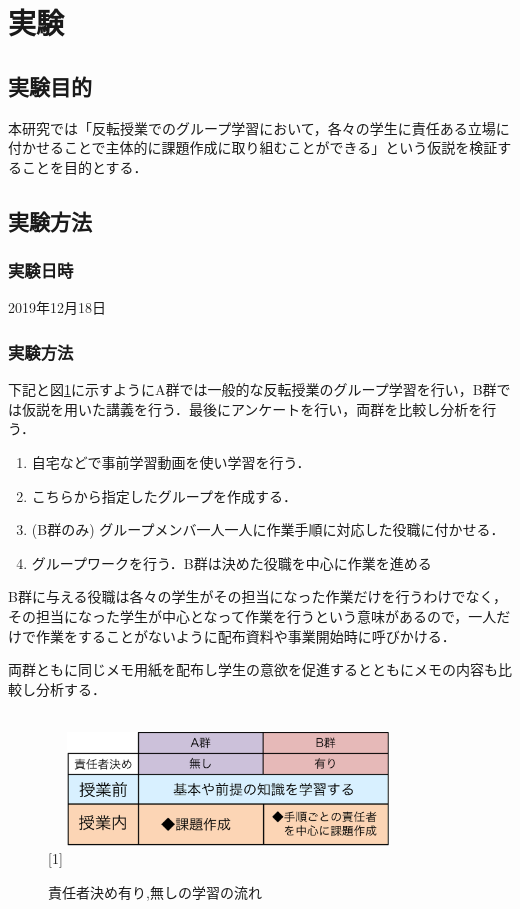 \documentclass[a4j,11pt]{jsarticle}
\begin{document}
\section{実験}

\subsection{実験目的}
本研究では「反転授業でのグループ学習において，各々の学生に責任ある立場に付かせることで主体的に課題作成に取り組むことができる」という仮説を検証することを目的とする．

\subsection{実験方法}

\subsubsection{実験日時}
2019年12月18日
\subsubsection{実験方法}
下記と図\ref{nagare}に示すようにA群では一般的な反転授業のグループ学習を行い，B群では仮説を用いた講義を行う．最後にアンケートを行い，両群を比較し分析を行う．


\begin{enumerate}
   \item 自宅などで事前学習動画を使い学習を行う．
   \item こちらから指定したグループを作成する．
   \item{(B群のみ) } グループメンバ一人一人に作業手順に対応した役職に付かせる．
   \item グループワークを行う．B群は決めた役職を中心に作業を進める
\end{enumerate}


B群に与える役職は各々の学生がその担当になった作業だけを行うわけでなく，その担当になった学生が中心となって作業を行うという意味があるので，一人だけで作業をすることがないように配布資料や事業開始時に呼びかける．

両群ともに同じメモ用紙を配布し学生の意欲を促進するとともにメモの内容も比較し分析する．



\begin{figure}[h]
\begin{center}
\scalebox{1}[1]{
 \includegraphics[clip,width=85mm,height=40mm]{nagare12.pdf}
 }
\end{center}
 \caption{責任者決め有り,無しの学習の流れ}
 \label{nagare}
\end{figure}
\end{document}
